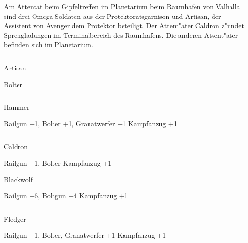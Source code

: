 
Am Attentat beim Gipfeltreffen im Planetarium beim Raumhafen von Valhalla sind drei Omega-Soldaten aus der Protektoratsgarnison und Artisan, der Assistent von Avenger dem Protektor beteiligt. Der Attent"ater Caldron z"undet Sprengladungen im Terminalbereich des Raumhafens. Die anderen Attent"ater befinden sich im Planetarium.

\begin{column}[l]{0.45}
    \begin{nscsheet}[h]{Artisan}
        \nscstats[ATT=2,AGG=2,DEX=2,COM=3]
        \nscruler
        \begin{nscinventory}
            \nscitem[Waffen] Bolter
        \end{nscinventory}
    \end{nscsheet}
\end{column}
\begin{column}[r]{0.45}
    \begin{nscsheet}[h]{Hammer}
        \nscstats[ATT=2,AGG=3,CON=2]
        \nscruler
        \begin{nscinventory}
            \nscitem[Waffen] Railgun +1, Bolter +1, Granatwerfer +1
            \nscitem[R"ustung] Kampfanzug +1       
        \end{nscinventory}
    \end{nscsheet}
\end{column}
\vfill\pagebreak

\begin{column}[l]{0.45}
    \begin{nscsheet}[h]{Caldron}
        \nscstats[ATT=2,AGG=3,CON=2]
        \nscruler
        \begin{nscinventory}
            \nscitem[Waffen] Railgun +1, Bolter
            \nscitem[R"ustung] Kampfanzug +1
        \end{nscinventory}
    \end{nscsheet}

    \begin{nscsheet}[h]{Blackwolf}
        \nscstats[ATT=2,AGG=3,CON=2]
        \nscruler
        \begin{nscinventory}
            \nscitem[Waffen] Railgun +6, Boltgun +4
            \nscitem[R"ustung] Kampfanzug +1
        \end{nscinventory}
    \end{nscsheet}    
\end{column}
\begin{column}[r]{0.45}
    \begin{nscsheet}[h]{Fledger}
        \nscstats[ATT=2,AGG=3,CON=2]
        \nscruler
        \begin{nscinventory}
            \nscitem[Waffen] Railgun +1, Bolter, Granatwerfer +1
            \nscitem[R"ustung] Kampfanzug +1
        \end{nscinventory}
    \end{nscsheet}        
\end{column}


